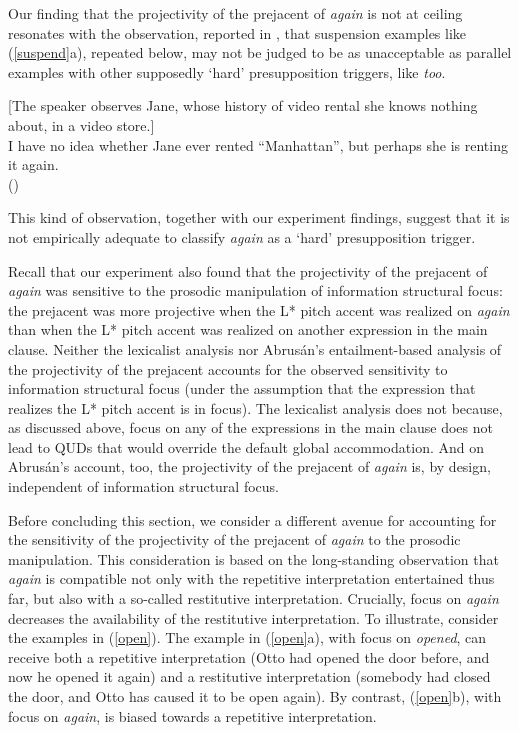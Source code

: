 \documentclass[a4paper,12pt]{article}
\def\infelic{{\leavevmode\llap{\#}}}
\newcommand{\6}{\mbox{$[\hspace*{-.6mm}[$}}
\newcommand{\9}{\mbox{$]\hspace*{-.6mm}]$}}
\begin{document}
Our finding that the projectivity of the prejacent of {\em again} is not at ceiling resonates with the observation, reported in \citealt[fn.3]{abrusan2016}, that suspension examples like (\ref{suspend}a), repeated below, may not be judged to be as unacceptable as parallel examples with other supposedly `hard' presupposition triggers, like {\em too}. 

\begin{exe}
 {[}The speaker observes Jane, whose history of video rental she knows nothing about, in a video store.] \\ \infelic I have no idea whether Jane ever rented ``Manhattan'', but perhaps she is renting it again. \\ \hspace*{.2cm} \hfill (\citealt[433]{simons01})
\end{exe}
This kind of observation, together with our experiment findings, suggest that it is not empirically adequate to classify {\em again} as a `hard' presupposition trigger. 

Recall that our experiment also found that the projectivity of the prejacent of {\em again} was sensitive to the prosodic manipulation of information structural focus: the prejacent was more projective when the L* pitch accent was realized on {\em again} than when the L* pitch accent was realized on another expression in the main clause. Neither the lexicalist analysis nor Abrus\'an's entailment-based analysis of the projectivity of the prejacent accounts for the observed sensitivity to information structural focus (under the assumption that the expression that realizes the L* pitch accent is in focus). The lexicalist analysis does not because, as discussed above, focus on any of the expressions in the main clause does not lead to QUDs that would override the default global accommodation. And on Abrus\'an's account, too, the projectivity of the prejacent of {\em again} is, by design, independent of information structural focus. 

Before concluding this section, we consider a different avenue for accounting for the sensitivity of the projectivity of the prejacent of {\em again} to the prosodic manipulation. This consideration is based on the long-standing observation that {\em again} is compatible not only with the repetitive interpretation entertained thus far, but also with a so-called restitutive interpretation. Crucially, focus on {\em again} decreases the availability of the restitutive interpretation. To illustrate, consider the examples in (\ref{open}). The example in (\ref{open}a), with focus on {\em opened}, can receive both a repetitive interpretation (Otto had opened the door before, and now he opened it again) and a restitutive interpretation (somebody had closed the door, and Otto has caused it to be open again). By contrast, (\ref{open}b), with focus on {\em again}, is biased towards a repetitive interpretation. 
\end{document}
